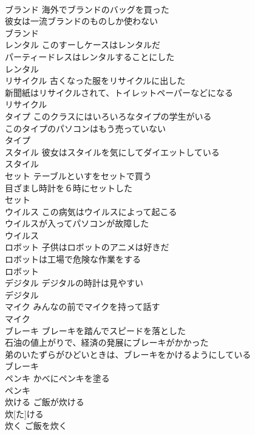 \documentclass[8pt]{extreport}
\begin{document}
\begin{CJK}{UTF8}{min}
\\	ブランド	海外でブランドのバッグを買った 
\\	彼女は一流ブランドのものしか使わない 
\\	ブランド						
\\	レンタル	このすーしケースはレンタルだ 
\\	パーティードレスはレンタルすることにした 
\\	レンタル			
\\	リサイクル	古くなった服をリサイクルに出した 
\\	新聞紙はリサイクルされて、トイレットペーパーなどになる 
\\	リサイクル						
\\	タイプ	このクラスにはいろいろなタイプの学生がいる 
\\	このタイプのパソコンはもう売っていない 
\\	タイプ						
\\	スタイル	彼女はスタイルを気にしてダイエットしている 
\\	スタイル						
\\	セット	テーブルといすをセットで買う 
\\	目ざまし時計を６時にセットした 
\\	セット						
\\	ウイルス	この病気はウイルスによって起こる 
\\	ウイルスが入ってパソコンが故障した 
\\	ウイルス						
\\	ロボット	子供はロボットのアニメは好きだ 
\\	ロボットは工場で危険な作業をする 
\\	ロボット						
\\	デジタル	デジタルの時計は見やすい 
\\	デジタル						
\\	マイク	みんなの前でマイクを持って話す 
\\	マイク						
\\	ブレーキ	ブレーキを踏んでスピードを落とした 
\\	石油の値上がりで、経済の発展にブレーキがかかった 
\\	弟のいたずらがひどいときは、ブレーキをかけるようにしている 
\\	ブレーキ						
\\	ペンキ	かべにペンキを塗る 
\\	ペンキ			
\\	炊ける	ご飯が炊ける 
\\	炊[た]ける						
\\	炊く	ご飯を炊く 

\end{CJK}
\end{document}
